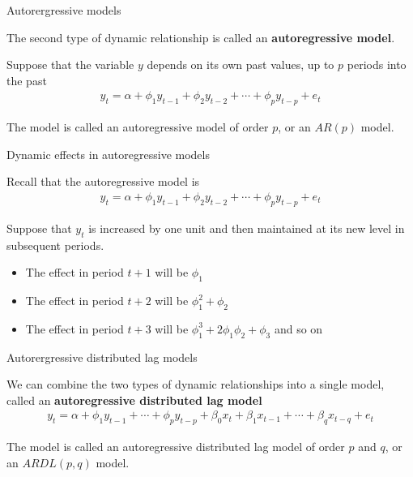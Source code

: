 \documentclass[10pt,aspectratio=169]{beamer}  %
\begin{document}

\begin{frame}{Autorergressive models}

    \bigskip

    The second type of dynamic relationship is called an \textbf{autoregressive model}.

    \medskip
    Suppose that the variable $ y $ depends on its own past values, up to $ p $ periods into the past
    \begin{align*}
        y_{t} = \alpha + \phi_{1} y_{t-1} + \phi_{2} y_{t-2} + \cdots + \phi_{p} y_{t-p} + e_{t}
    \end{align*}

    The model is called an autoregressive model of order $ p $, or an $ AR(p) $ model.

\end{frame}


\begin{frame}{Dynamic effects in autoregressive models}

    \bigskip

    Recall that the autoregressive model is
    \begin{align*}
        y_{t} = \alpha + \phi_{1} y_{t-1} + \phi_{2} y_{t-2} + \cdots + \phi_{p} y_{t-p} + e_{t}
    \end{align*}

    Suppose that $ y_{t} $ is increased by one unit and then maintained at its new level in subsequent periods.
    \begin{itemize}
        \item The effect in period $ t + 1 $ will be $ \phi_{1} $
        \item The effect in period $ t + 2 $ will be $ \phi_{1}^2 + \phi_{2} $
        \item The effect in period $ t + 3 $ will be $ \phi_{1}^3 + 2 \phi_{1}\phi_{2} + \phi_{3} $ and so on
    \end{itemize}

\end{frame}


\begin{frame}{Autorergressive distributed lag models}

    \bigskip

    We can combine the two types of dynamic relationships into a single model, called an \textbf{autoregressive distributed lag model}
    \begin{align*}
        y_{t} = \alpha + \phi_{1} y_{t-1} + \cdots + \phi_{p} y_{t-p} + \beta_{0} x_{t} + \beta_{1} x_{t-1} + \cdots + \beta_{q} x_{t-q} + e_{t}
    \end{align*}

    The model is called an autoregressive distributed lag model of order $ p $ and $ q $, or an $ ARDL(p, q) $ model.

\end{frame}
\end{document}
